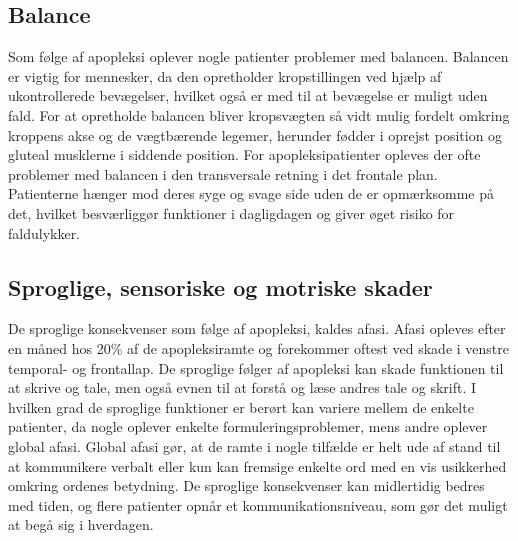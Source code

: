 \subsection{Balance}
Som følge af apopleksi oplever nogle patienter problemer med balancen. Balancen er vigtig for mennesker, da den opretholder kropstillingen ved hjælp af ukontrollerede bevægelser, hvilket også er med til at bevægelse er muligt uden fald. For at opretholde balancen bliver kropsvægten så vidt mulig fordelt omkring kroppens akse og de vægtbærende legemer, herunder fødder i oprejst position og gluteal musklerne i siddende position.\citep{Nichols1997}   
For apopleksipatienter opleves der ofte problemer med balancen i den transversale retning i det frontale plan. Patienterne hænger mod deres syge og svage side uden de er opmærksomme på det, hvilket besværliggør funktioner i dagligdagen og giver øget risiko for faldulykker. %

\subsection{Sproglige, sensoriske og motriske skader}
De sproglige konsekvenser som følge af apopleksi, kaldes afasi. Afasi opleves efter en måned hos 20\% af de apopleksiramte og forekommer oftest ved skade i venstre temporal- og frontallap. De sproglige følger af apopleksi kan skade funktionen til at skrive og tale, men også evnen til at forstå og læse andres tale og skrift. I hvilken grad de sproglige funktioner er berørt kan variere mellem de enkelte patienter, da nogle oplever enkelte formuleringsproblemer, mens andre oplever global afasi. Global afasi gør, at de ramte i nogle tilfælde er helt ude af stand til at kommunikere verbalt eller kun kan fremsige enkelte ord med en vis usikkerhed omkring ordenes betydning.
De sproglige konsekvenser kan midlertidig bedres med tiden, og flere patienter opnår et kommunikationsniveau, som gør det muligt at begå sig i hverdagen.\citep{Muus2008}

